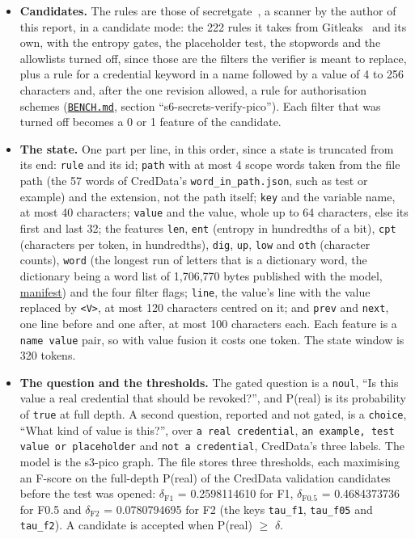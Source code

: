 \documentclass[10pt]{article}
\begin{document}
\begin{itemize}
\item \textbf{Candidates.} The rules are those of secretgate~\cite{secretgate}, a scanner by the author of this report, in a candidate mode: the 222 rules it takes from Gitleaks~\cite{gitleaks} and its own, with the entropy gates, the placeholder test, the stopwords and the allowlists turned off, since those are the filters the verifier is meant to replace, plus a rule for a credential keyword in a name followed by a value of 4 to 256 characters and, after the one revision allowed, a rule for authorisation schemes (\href{https://github.com/maxgfr/skycmd/blob/main/BENCH.md}{\texttt{BENCH.md}}, section ``s6-secrets-verify-pico''). Each filter that was turned off becomes a 0 or 1 feature of the candidate.
\item \textbf{The state.} One part per line, in this order, since a state is truncated from its end: \texttt{rule} and its id; \texttt{path} with at most 4 scope words taken from the file path (the 57 words of CredData's \texttt{word\_\allowbreak{}in\_\allowbreak{}path.json}, such as test or example) and the extension, not the path itself; \texttt{key} and the variable name, at most 40 characters; \texttt{value} and the value, whole up to 64 characters, else its first and last 32; the features \texttt{len}, \texttt{ent} (entropy in hundredths of a bit), \texttt{cpt} (characters per token, in hundredths), \texttt{dig}, \texttt{up}, \texttt{low} and \texttt{oth} (character counts), \texttt{word} (the longest run of letters that is a dictionary word, the dictionary being a word list of 1,706,770 bytes published with the model, \href{https://maxgfr.github.io/skycmd/models/manifest.json}{manifest}) and the four filter flags; \texttt{line}, the value's line with the value replaced by \texttt{\textless{}V\textgreater{}}, at most 120 characters centred on it; and \texttt{prev} and \texttt{next}, one line before and one after, at most 100 characters each. Each feature is a \texttt{name value} pair, so with value fusion it costs one token. The state window is 320 tokens.
\item \textbf{The question and the thresholds.} The gated question is a \texttt{noul}, ``Is this value a real credential that should be revoked?'', and P(real) is its probability of \texttt{true} at full depth. A second question, reported and not gated, is a \texttt{choice}, ``What kind of value is this?'', over \texttt{a real credential}, \texttt{an example, test value or placeholder} and \texttt{not a credential}, CredData's three labels. The model is the s3-pico graph. The file stores three thresholds, each maximising an F-score on the full-depth P(real) of the CredData validation candidates before the test was opened: $\delta_{\mathrm{F1}}$ = 0.2598114610 for F1, $\delta_{\mathrm{F0.5}}$ = 0.4684373736 for F0.5 and $\delta_{\mathrm{F2}}$ = 0.0780794695 for F2 (the keys \texttt{tau\_\allowbreak{}f1}, \texttt{tau\_\allowbreak{}f05} and \texttt{tau\_\allowbreak{}f2}). A candidate is accepted when P(real) $\geq$ $\delta$.
\end{itemize}
\end{document}
